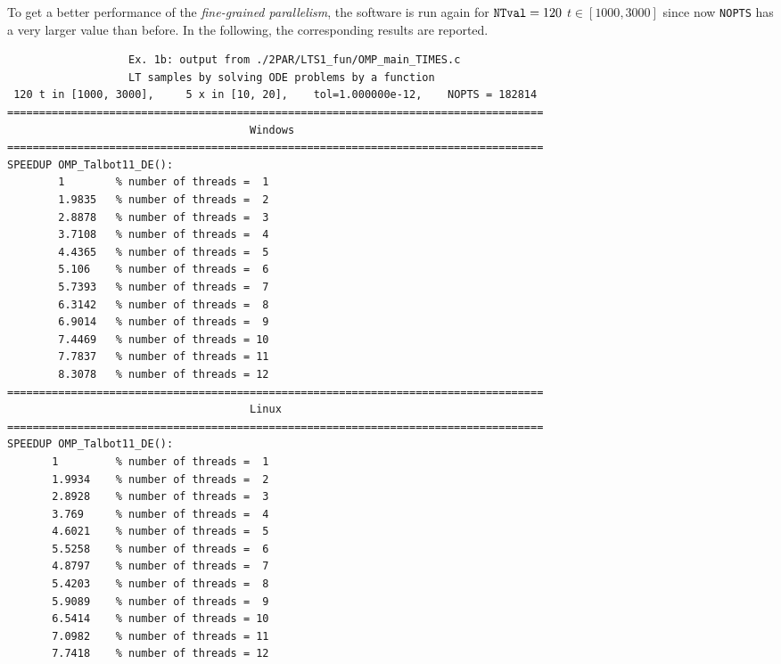 \documentclass[a4paper,10pt]{report}%
\begin{document}
\newpage
\noindent To get a better performance of the {\em fine-grained parallelism}, the software is run again for
${\tt NTval}=120$ $t\in[1000,3000]$ since now {\tt NOPTS} has a very larger value than before.
In the following, the corresponding results are reported.
\begin{lstlisting}
                   Ex. 1b: output from ./2PAR/LTS1_fun/OMP_main_TIMES.c
                   LT samples by solving ODE problems by a function
 120 t in [1000, 3000],     5 x in [10, 20],    tol=1.000000e-12,    NOPTS = 182814
====================================================================================
                                      Windows
====================================================================================
SPEEDUP OMP_Talbot11_DE():
        1        % number of threads =  1
        1.9835   % number of threads =  2
        2.8878   % number of threads =  3
        3.7108   % number of threads =  4
        4.4365   % number of threads =  5
        5.106    % number of threads =  6
        5.7393   % number of threads =  7
        6.3142   % number of threads =  8
        6.9014   % number of threads =  9
        7.4469   % number of threads = 10
        7.7837   % number of threads = 11
        8.3078   % number of threads = 12
====================================================================================
                                      Linux
====================================================================================
SPEEDUP OMP_Talbot11_DE():
       1         % number of threads =  1
       1.9934    % number of threads =  2
       2.8928    % number of threads =  3
       3.769     % number of threads =  4
       4.6021    % number of threads =  5
       5.5258    % number of threads =  6
       4.8797    % number of threads =  7
       5.4203    % number of threads =  8
       5.9089    % number of threads =  9
       6.5414    % number of threads = 10
       7.0982    % number of threads = 11
       7.7418    % number of threads = 12


\end{lstlisting}
\end{document}
